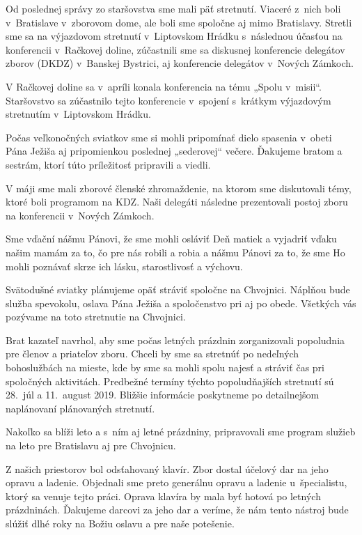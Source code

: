 

Od poslednej správy zo staršovstva sme mali päť stretnutí. Viaceré z~nich boli v~Bratislave v~zborovom dome, ale boli sme spoločne aj mimo Bratislavy. Stretli sme sa na výjazdovom stretnutí v~Liptovskom Hrádku s~následnou účasťou na konferencii v~Račkovej doline, zúčastnili sme sa diskusnej konferencie delegátov zborov (DKDZ) v~Banskej Bystrici, aj konferencie delegátov v~Nových Zámkoch.

V Račkovej doline sa v~apríli konala konferencia na tému „Spolu v~misii“. Staršovstvo sa zúčastnilo tejto konferencie v~spojení s~krátkym výjazdovým stretnutím v~Liptovskom Hrádku.

Počas veľkonočných sviatkov sme si mohli pripomínať dielo spasenia v~obeti Pána Ježiša aj pripomienkou poslednej „sederovej“ večere. Ďakujeme bratom a sestrám, ktorí túto príležitosť pripravili a viedli.

V máji sme mali zborové členské zhromaždenie, na ktorom sme diskutovali témy, ktoré boli programom na KDZ. Naši delegáti následne prezentovali postoj zboru na konferencii v~Nových Zámkoch.

Sme vďační nášmu Pánovi, že sme mohli osláviť Deň matiek a vyjadriť vďaku našim mamám za to, čo pre nás robili a robia a nášmu Pánovi za to, že sme Ho mohli poznávať skrze ich lásku, starostlivosť a výchovu.

Svätodušné sviatky plánujeme opäť stráviť spoločne na Chvojnici. Náplňou bude služba spevokolu, oslava Pána Ježiša a spoločenstvo pri aj po obede. Všetkých vás pozývame na toto stretnutie na Chvojnici.

Brat kazateľ navrhol, aby sme počas letných prázdnin zorganizovali popoludnia pre členov a priateľov zboru. Chceli by sme sa stretnúť po nedeľných bohoslužbách na mieste, kde by sme sa mohli spolu najesť a stráviť čas pri spoločných aktivitách. Predbežné termíny týchto popoludňajších stretnutí sú 28.~júl a 11.~august 2019. Bližšie informácie poskytneme po detailnejšom naplánovaní plánovaných stretnutí.

Nakoľko sa blíži leto a s~ním aj letné prázdniny, pripravovali sme program služieb na leto pre Bratislavu aj pre Chvojnicu.

Z našich priestorov bol odsťahovaný klavír. Zbor dostal účelový dar na jeho opravu a ladenie. Objednali sme preto generálnu opravu a ladenie u~špecialistu, ktorý sa venuje tejto práci. Oprava klavíra by mala byť hotová po letných prázdninách. Ďakujeme darcovi za jeho dar a veríme, že nám tento nástroj bude slúžiť dlhé roky na Božiu oslavu a pre naše potešenie.

